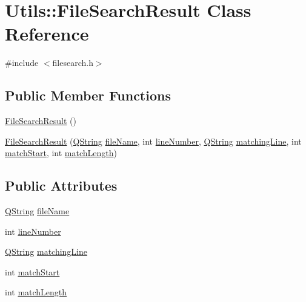 \hypertarget{class_utils_1_1_file_search_result}{\section{\-Utils\-:\-:\-File\-Search\-Result \-Class \-Reference}
\label{class_utils_1_1_file_search_result}
}


{\ttfamily \#include $<$filesearch.\-h$>$}

\subsection*{\-Public \-Member \-Functions}
\begin{DoxyCompactItemize}
\item 
\hyperlink{class_utils_1_1_file_search_result_afc086f77d2195a153caf39e65abc54a8}{\-File\-Search\-Result} ()
\item 
\hyperlink{class_utils_1_1_file_search_result_ad1365f94c51572bc38e73ddfe5705b3f}{\-File\-Search\-Result} (\hyperlink{group___u_a_v_objects_plugin_gab9d252f49c333c94a72f97ce3105a32d}{\-Q\-String} \hyperlink{class_utils_1_1_file_search_result_a6768edb856c8a6055d2e3e04dc94a969}{file\-Name}, int \hyperlink{class_utils_1_1_file_search_result_a5bd90f47d915c5af4af62bed46abe7c2}{line\-Number}, \hyperlink{group___u_a_v_objects_plugin_gab9d252f49c333c94a72f97ce3105a32d}{\-Q\-String} \hyperlink{class_utils_1_1_file_search_result_a9fb2f9e0118742e307425f781375e572}{matching\-Line}, int \hyperlink{class_utils_1_1_file_search_result_a98b3933b899ba1a74c80c1910ff7701f}{match\-Start}, int \hyperlink{class_utils_1_1_file_search_result_a57bcfdc2bdae981ab37fb9e27bb244c5}{match\-Length})
\end{DoxyCompactItemize}
\subsection*{\-Public \-Attributes}
\begin{DoxyCompactItemize}
\item 
\hyperlink{group___u_a_v_objects_plugin_gab9d252f49c333c94a72f97ce3105a32d}{\-Q\-String} \hyperlink{class_utils_1_1_file_search_result_a6768edb856c8a6055d2e3e04dc94a969}{file\-Name}
\item 
int \hyperlink{class_utils_1_1_file_search_result_a5bd90f47d915c5af4af62bed46abe7c2}{line\-Number}
\item 
\hyperlink{group___u_a_v_objects_plugin_gab9d252f49c333c94a72f97ce3105a32d}{\-Q\-String} \hyperlink{class_utils_1_1_file_search_result_a9fb2f9e0118742e307425f781375e572}{matching\-Line}
\item 
int \hyperlink{class_utils_1_1_file_search_result_a98b3933b899ba1a74c80c1910ff7701f}{match\-Start}
\item 
int \hyperlink{class_utils_1_1_file_search_result_a57bcfdc2bdae981ab37fb9e27bb244c5}{match\-Length}
\end{DoxyCompactItemize}


